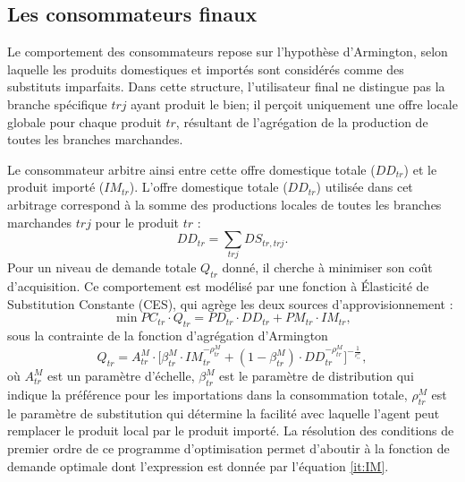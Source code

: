 \documentclass[11pt,a4paper]{article}
\newcommand{\tr}{\mathit{tr}}
\newcommand{\trj}{\mathit{trj}}
\newcommand{\DD}{\mathit{DD}}
\newcommand{\DS}{\mathit{DS}}
\newcommand{\IM}{\mathit{IM}}
\newcommand{\PC}{\mathit{PC}}
\newcommand{\PD}{\mathit{PD}}
\newcommand{\PM}{\mathit{PM}}
\begin{document}
	
	\subsection{Les consommateurs finaux}
	Le comportement des consommateurs repose sur l'hypothèse d'Armington, selon laquelle les produits domestiques et importés sont considérés comme des substituts imparfaits. Dans cette structure, l'utilisateur final ne distingue pas la branche spécifique $\trj$ ayant produit le bien; il perçoit uniquement une offre locale globale pour chaque produit $\tr$, résultant de l'agrégation de la production de toutes les branches marchandes. 
	
	Le consommateur arbitre ainsi entre cette offre domestique totale ($\DD_{\tr}$) et le produit importé ($\IM_{\tr}$). L'offre domestique totale ($\DD_{tr}$) utilisée dans cet arbitrage correspond à la somme des productions locales de toutes les branches marchandes $\trj$ pour le produit $\tr$ :
	\begin{equation*}
		\DD_{\tr} = \sum_{\trj} \DS_{\tr, \trj}.
	\end{equation*}
	Pour un niveau de demande totale $Q_{\tr}$ donné, il cherche à minimiser son coût d'acquisition. Ce comportement est modélisé par une fonction à {Élasticité de Substitution Constante (CES)}, qui agrège les deux sources d'approvisionnement :
	\begin{equation*}
		\min \PC_{\tr} \cdot Q_{\tr} = \PD_{tr} \cdot \DD_{\tr} + \PM_{\tr} \cdot \IM_{\tr},
	\end{equation*}
	sous la contrainte de la fonction d'agrégation d'Armington
	\begin{equation*}
		Q_{\tr} = A_{\tr}^M \cdot \bigg[\beta_{\tr}^M\cdot\IM_{\tr}^{-\rho_{\tr}^M} + \left(1 - \beta_{\tr}^M\right)\cdot\DD_{\tr}^{-\rho_{\tr}^M}\bigg]^{-\frac{1}{^{\rho_{\tr}^M}}},
	\end{equation*}
	où $A_{\tr}^M$ est un paramètre d'échelle, $\beta_{\tr}^M$ est le paramètre de distribution qui indique la préférence pour les importations dans la consommation totale, $\rho_{\tr}^M$ est le paramètre de substitution qui détermine la facilité avec laquelle l'agent peut remplacer le produit local par le produit importé. La résolution des conditions de premier ordre de ce programme d'optimisation permet d'aboutir à la fonction de demande optimale dont l'expression est donnée par l'équation \ref{it:IM}.	
	
\end{document}

